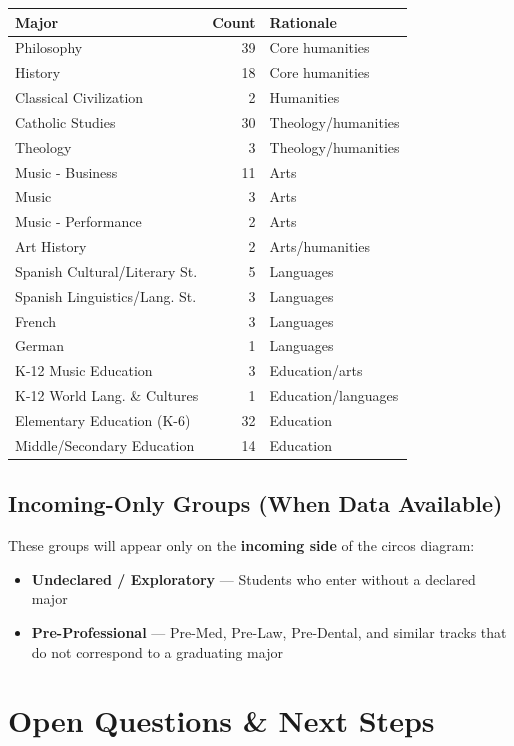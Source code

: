 \documentclass[
  11pt,
  letterpaper,
]{report}
\begin{document}
\begin{longtable}[]{@{}lrl@{}}
\toprule\noalign{}
Major & Count & Rationale \\
\midrule\noalign{}
\endhead
\bottomrule\noalign{}
\endlastfoot
Philosophy & 39 & Core humanities \\
History & 18 & Core humanities \\
Classical Civilization & 2 & Humanities \\
Catholic Studies & 30 & Theology/humanities \\
Theology & 3 & Theology/humanities \\
Music - Business & 11 & Arts \\
Music & 3 & Arts \\
Music - Performance & 2 & Arts \\
Art History & 2 & Arts/humanities \\
Spanish Cultural/Literary St. & 5 & Languages \\
Spanish Linguistics/Lang. St. & 3 & Languages \\
French & 3 & Languages \\
German & 1 & Languages \\
K-12 Music Education & 3 & Education/arts \\
K-12 World Lang. \& Cultures & 1 & Education/languages \\
Elementary Education (K-6) & 32 & Education \\
Middle/Secondary Education & 14 & Education \\
\end{longtable}

\section{Incoming-Only Groups (When Data
Available)}\label{incoming-only-groups-when-data-available}

These groups will appear only on the \textbf{incoming side} of the
circos diagram:

\begin{itemize}
\item \textbf{Undeclared / Exploratory} — Students who enter without a declared major
\item \textbf{Pre-Professional} — Pre-Med, Pre-Law, Pre-Dental, and similar tracks that do not correspond to a graduating major
\end{itemize}

\chapter{Open Questions \& Next Steps}\label{open-questions-next-steps}
\end{document}
